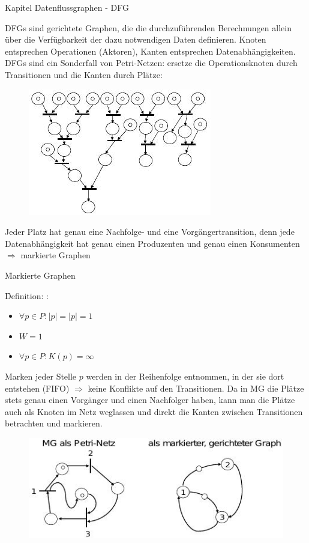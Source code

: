 \begin{chapter}{Kapitel}
\newpage
\f{Datenflussgraphen - DFG}

\noindent DFGs sind gerichtete Graphen, die die durchzuführenden Berechnungen allein über die Verfügbarkeit der dazu notwendigen Daten definieren. Knoten 
entsprechen Operationen (Aktoren), Kanten entsprechen Datenabhängigkeiten. DFGs sind ein Sonderfall von Petri-Netzen: ersetze die Operationsknoten durch 
Transitionen und die Kanten durch Plätze:
\begin{figure}[!ht]
 \centering
 \includegraphics[scale=0.8]{pics/dfgPetri}
\end{figure}

\noindent Jeder Platz hat genau eine Nachfolge- und eine Vorgängertransition, denn jede Datenabhängigkeit hat genau einen Produzenten und genau einen Konsumenten
$\Rightarrow$ markierte Graphen 
\vspace*{6pt}

\f{Markierte Graphen}

\noindent \f{Definition}: :
\begin{itemize}
 \item $\forall p\in P: |$\textbullet$p| = |p$\textbullet$| = 1$
 \item $W=1$
 \item $\forall p\in P:K(p)=\infty$
\end{itemize}

\noindent Marken jeder Stelle $p$ werden in der Reihenfolge entnommen, in der sie dort entstehen (FIFO) $\Rightarrow$ keine Konflikte auf den Transitionen. Da in 
MG die Plätze stets genau einen Vorgänger und einen Nachfolger haben, kann man die Plätze auch als Knoten im Netz weglassen und direkt die Kanten zwischen 
Transitionen betrachten und markieren. 
\begin{figure}[!ht]
 \centering
 \includegraphics[scale=0.8]{pics/mgpetri}
\end{figure}


\end{chapter}

